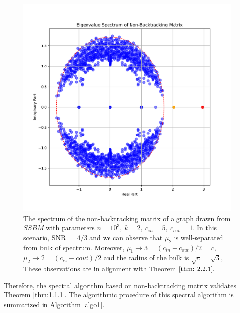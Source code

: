 \begin{figure}
    \centering
    \includegraphics[width=1\linewidth]{Figures/spectrum_plot.pdf}
    \caption[Spectrum Distribution of the Non-Backtracking Matrix]{The spectrum of the non-backtracking matrix of a graph drawn from $SSBM$ with parameters $n=10^3,~k=2,~c_{in}=5,~c_{out}=1.$ In this scenario, SNR $=4/3$ and we can observe that $\mu_2$ is well-separated from bulk of spectrum. Moreover, $\mu_1\to3=(c_{in}+c_{out})/2=c$, $\mu_2\to2=(c_{in}-c{out})/2$ and the radius of the bulk is $\sqrt{c}=\sqrt{3},$ These observations are in alignment with Theorem $\ref{thm: 2.2.1}.$}
    \label{fig: spectrum}
\end{figure}

Therefore, the spectral algorithm based on non-backtracking matrix validates Theorem \ref{thm:1.1.1}. The algorithmic procedure of this spectral algorithm is summarized in Algorithm \ref{algo1}.

